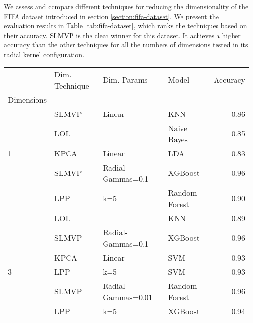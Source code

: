 We assess and compare different techniques for reducing the dimensionality of the FIFA dataset introduced in section \ref{section:fifa-dataset}. We present the evaluation results in Table \ref{tab:fifa-dataset}, which ranks the techniques based on their accuracy.
SLMVP is the clear winner for this dataset. It achieves a higher accuracy than the other techniques for all the numbers of dimensions tested in its radial kernel configuration.

\begin{table}[!ht]
    \begin{tabular}{llllr}
        \toprule
        {}                                      & Dim. Technique & Dim. Params        & Model         & Accuracy \\
        Dimensions                              &                &                    &               &          \\
        \midrule
                                                & SLMVP          & Linear             & KNN           & 0.86     \\
                                                & LOL            &                    & Naive Bayes   & 0.85     \\
        \multirow{-3}{*}{1}                     & KPCA           & Linear             & LDA           & 0.83     \\
        \rowcolor{lightgray}                    & SLMVP          & Radial-Gammas=0.1  & XGBoost       & 0.96     \\
        \rowcolor{lightgray}                    & LPP            & k=5                & Random Forest & 0.90     \\
        \rowcolor{lightgray}\multirow{-3}{*}{2} & LOL            &                    & KNN           & 0.89     \\
                                                & SLMVP          & Radial-Gammas=0.1  & XGBoost       & 0.96     \\
                                                & KPCA           & Linear             & SVM           & 0.93     \\
        \multirow{-3}{*}{3}                     & LPP            & k=5                & SVM           & 0.93     \\
        \rowcolor{lightgray}                    & SLMVP          & Radial-Gammas=0.01 & Random Forest & 0.96     \\
        \rowcolor{lightgray}                    & LPP            & k=5                & XGBoost       & 0.94     \\

\end{tabular}
\end{table}

